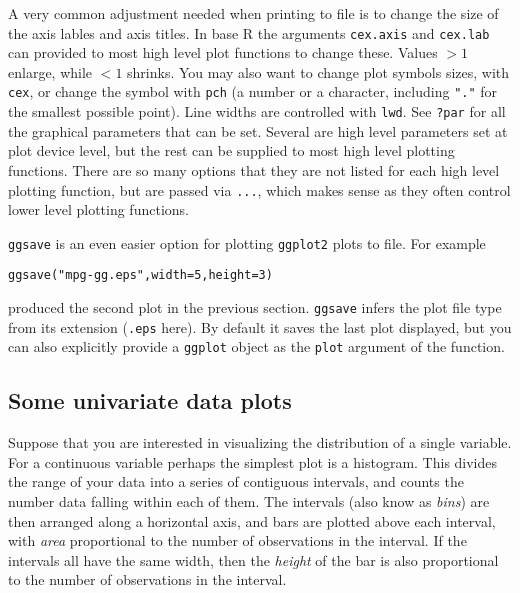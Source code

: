 \documentclass[10pt] {article}
\theoremstyle{definition}
\begin{document}
A very common adjustment needed when printing to file is to change the size of the axis lables and axis titles. In base R the arguments \lstinline+cex.axis+ and \lstinline+cex.lab+ can provided to most high level plot functions to change these. Values $>1$ enlarge, while $<1$ shrinks. You may also want to change plot symbols sizes, with \lstinline+cex+, or change the symbol with \lstinline+pch+ (a number or a character, including \lstinline+"."+ for the smallest possible point). Line widths are controlled with \lstinline+lwd+. See \lstinline+?par+ for all the graphical parameters that can be set. Several are high level parameters set at plot device level, but the rest can be supplied to most high level plotting functions. There are so many options that they are not listed for each high level plotting function, but are passed via \lstinline+...+, which makes sense as they often control lower level plotting functions.   

{\tt ggsave} is an even easier option for plotting {\tt ggplot2} plots to file. For example
\begin{lstlisting}
ggsave("mpg-gg.eps",width=5,height=3)
\end{lstlisting}
produced the second plot in the previous section. {\tt ggsave} infers the plot file type from its extension ({\tt .eps} here). By default it saves the last plot displayed, but you can also explicitly provide a {\tt ggplot} object as the {\tt plot} argument of the function.

\subsection{Some univariate data plots \label{sec:1d-plot}}

Suppose that you are interested in visualizing the distribution of a single variable. For a continuous variable perhaps the simplest plot is a histogram. This divides the range of your data into a series of contiguous intervals, and counts the number data falling within each of them. The intervals (also know as {\em bins}) are then arranged along a horizontal axis, and bars are plotted above each interval, with {\em area} proportional to the number of observations in the interval. If the intervals all have the same width, then the {\em height} of the bar is also proportional to the number of observations in the interval.   
\end{document}
